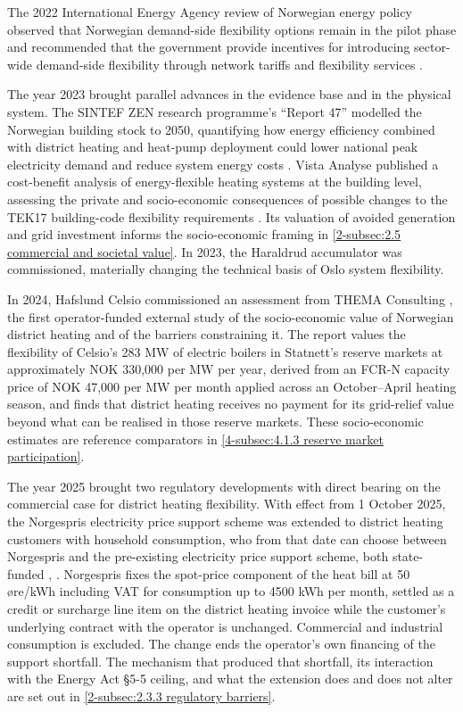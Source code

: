The 2022 International Energy Agency review of Norwegian energy policy observed that Norwegian demand-side flexibility options remain in the pilot phase and recommended that the government provide incentives for introducing sector-wide demand-side flexibility through network tariffs and flexibility services \cite{iea_-_international_energy_agency_norway_2022}.

The year 2023 brought parallel advances in the evidence base and in the physical system. The SINTEF ZEN research programme's ``Report 47'' modelled the Norwegian building stock to 2050, quantifying how energy efficiency combined with district heating and heat-pump deployment could lower national peak electricity demand and reduce system energy costs \cite{SINTEF_energy_2023}. Vista Analyse published a cost-benefit analysis of energy-flexible heating systems at the building level, assessing the private and socio-economic consequences of possible changes to the TEK17 building-code flexibility requirements \cite{rosnes_energifleksible_2023}. Its valuation of avoided generation and grid investment informs the socio-economic framing in \autoref{2-subsec:2.5 commercial and societal value}. In 2023, the Haraldrud accumulator was commissioned, materially changing the technical basis of Oslo system flexibility.

In 2024, Hafslund Celsio commissioned an assessment from THEMA Consulting \cite{Thema_fjernvarme_2024}, the first operator-funded external study of the socio-economic value of Norwegian district heating and of the barriers constraining it. The report values the flexibility of Celsio's 283 MW of electric boilers in Statnett's reserve markets at approximately NOK 330{,}000 per MW per year, derived from an FCR-N capacity price of NOK 47{,}000 per MW per month applied across an October--April heating season, and finds that district heating receives no payment for its grid-relief value beyond what can be realised in those reserve markets. These socio-economic estimates are reference comparators in \autoref{4-subsec:4.1.3 reserve market participation}.

The year 2025 brought two regulatory developments with direct bearing on the commercial case for district heating flexibility. With effect from 1 October 2025, the Norgespris electricity price support scheme was extended to district heating customers with household consumption, who from that date can choose between Norgespris and the pre-existing electricity price support scheme, both state-funded \cite{energidepartementet_forskrift_2025}, \cite{nve_norgespris_2026}. Norgespris fixes the spot-price component of the heat bill at 50 øre/kWh including VAT for consumption up to 4500 kWh per month, settled as a credit or surcharge line item on the district heating invoice while the customer's underlying contract with the operator is unchanged. Commercial and industrial consumption is excluded. The change ends the operator's own financing of the support shortfall. The mechanism that produced that shortfall, its interaction with the Energy Act §5-5 ceiling, and what the extension does and does not alter are set out in \autoref{2-subsec:2.3.3 regulatory barriers}.

